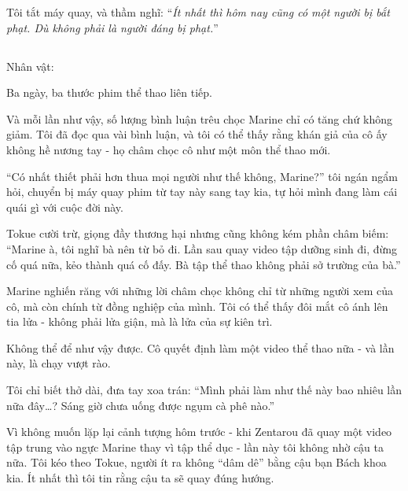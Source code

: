 \documentclass[../main.tex]{subfiles}
\begin{document}
Tôi tắt máy quay, và thầm nghĩ: ``\textit{Ít nhất thì hôm nay cũng có một người bị bắt phạt. Dù không phải là người đáng bị phạt.}''

\newpage

\subsection*{\label{ep-S16.VIII}}
\vspace{-4pt}
\begin{center}
    {\caviar\fontsize{12pt}{12pt}\selectfont Nhân vật:  }
\end{center}

Ba ngày, ba thước phim thể thao liên tiếp.

Và mỗi lần như vậy, số lượng bình luận trêu chọc Marine chỉ có tăng chứ không giảm. Tôi đã đọc qua vài bình luận, và tôi có thể thấy rằng khán giả của cô ấy không hề nương tay - họ châm chọc cô như một môn thể thao mới.

``Có nhất thiết phải hơn thua mọi người như thế không, Marine?'' tôi ngán ngẩm hỏi, chuyển bị máy quay phim từ tay này sang tay kia, tự hỏi mình đang làm cái quái gì với cuộc đời này.

Tokue cười trừ, giọng đầy thương hại nhưng cũng không kém phần châm biếm: ``Marine à, tôi nghĩ bà nên từ bỏ đi. Lần sau quay video tập dưỡng sinh đi, đừng cố quá nữa, kẻo thành quá cố đấy. Bà tập thể thao không phải sở trường của bà.''

Marine nghiến răng với những lời châm chọc không chỉ từ những người xem của cô, mà còn chính từ đồng nghiệp của mình. Tôi có thể thấy đôi mắt cô ánh lên tia lửa - không phải lửa giận, mà là lửa của sự kiên trì.

Không thể để như vậy được. Cô quyết định làm một video thể thao nữa - và lần này, là chạy vượt rào.

Tôi chỉ biết thở dài, đưa tay xoa trán: ``Mình phải làm như thế này bao nhiêu lần nữa đây\dots? Sáng giờ chưa uống được ngụm cà phê nào.''

\ct

Vì không muốn lặp lại cảnh tượng hôm trước - khi Zentarou đã quay một video tập trung vào ngực Marine thay vì tập thể dục - lần này tôi không nhờ cậu ta nữa. Tôi kéo theo Tokue, người ít ra không ``dâm dê'' bằng cậu bạn Bách khoa kia. Ít nhất thì tôi tin rằng cậu ta sẽ quay đúng hướng.
\end{document}
